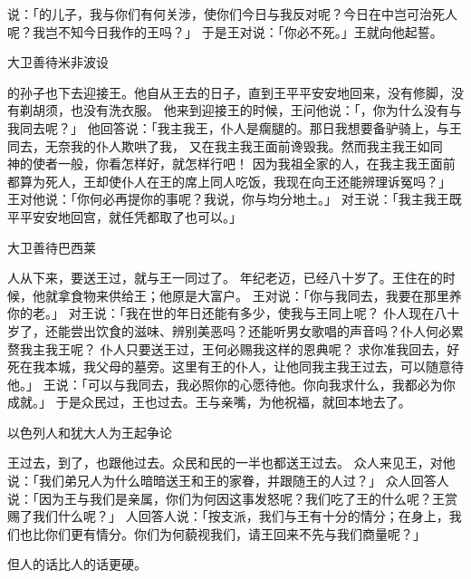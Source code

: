 {说：「{}的儿子，我与你们有何关涉，使你们今日与我反对呢？今日在{}中岂可治死人呢？我岂不知今日我作{}的王吗？」
于是王对{}说：「你必不死。」王就向他起誓。
\par }{\SH 大卫善待米非波设
\par }{\PP {}的孙子{}也下去迎接王。他自从王去的日子，直到王平平安安地回来，没有修脚，没有剃胡须，也没有洗衣服。
他来到{}迎接王的时候，王问他说：「{}，你为什么没有与我同去呢？」
他回答说：「我主我王，仆人是瘸腿的。那日我想要备驴骑上，与王同去，无奈我的仆人欺哄了我，
又在我主我王面前谗毁我。然而我主我王如同　神的使者一般，你看怎样好，就怎样行吧！
因为我祖全家的人，在我主我王面前都算为死人，王却使仆人在王的席上同人吃饭，我现在向王还能辨理诉冤吗？」
王对他说：「你何必再提你的事呢？我说，你与{}均分地土。」
对王说：「我主我王既平平安安地回宫，就任凭{}都取了也可以。」
\par }{\SH 大卫善待巴西莱
\par }{\PP {}人{}从{}下来，要送王过{}，就与王一同过了{}。
年纪老迈，已经八十岁了。王住在{}的时候，他就拿食物来供给王；他原是大富户。
王对{}说：「你与我同去，我要在{}那里养你的老。」
对王说：「我在世的年日还能有多少，使我与王同上{}呢？
仆人现在八十岁了，还能尝出饮食的滋味、辨别美恶吗？还能听男女歌唱的声音吗？仆人何必累赘我主我王呢？
仆人只要送王过{}，王何必赐我这样的恩典呢？
求你准我回去，好死在我本城，{}我父母的墓旁。这里有王的仆人{}，让他同我主我王过去，可以随意待他。」
王说：「{}可以与我同去，我必照你的心愿待他。你向我求什么，我都必为你成就。」
于是众民过{}，王也过去。王与{}亲嘴，为他祝福，{}就回本地去了。
\par }{\SH 以色列人和犹大人为王起争论
\par }{\PP {}王过去，到了{}，{}也跟他过去。{}众民和{}民的一半也都送王过去。
众人来见王，对他说：「我们弟兄{}人为什么暗暗送王和王的家眷，并跟随王的人过{}？」
众人回答{}人说：「因为王与我们是亲属，你们为何因这事发怒呢？我们吃了王的什么呢？王赏赐了我们什么呢？」
人回答{}人说：「按支派，我们与王有十分的情分；在{}身上，我们也比你们更有情分。你们为何藐视我们，请王回来不先与我们商量呢？」
\par }{\PP 但{}人的话比{}人的话更硬。

}
